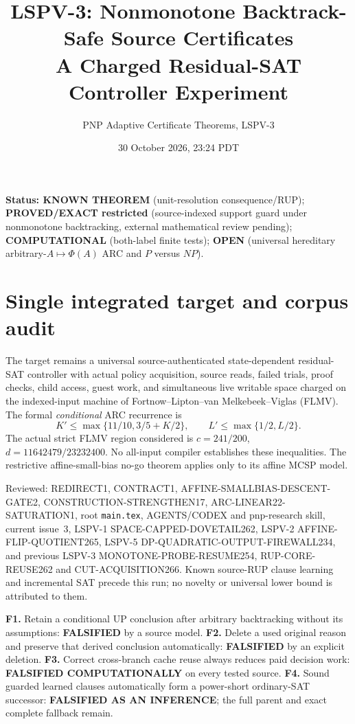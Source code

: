 \documentclass[11pt]{article}
\title{LSPV-3: Nonmonotone Backtrack-Safe Source Certificates\\A Charged Residual-SAT Controller Experiment}
\author{PNP Adaptive Certificate Theorems, LSPV-3}
\date{30 October 2026, 23:24 PDT}
\begin{document}
\maketitle
\noindent\textbf{Status: KNOWN THEOREM} (unit-resolution consequence/RUP);
\textbf{PROVED/EXACT restricted} (source-indexed support guard under
nonmonotone backtracking, external mathematical review pending);
\textbf{COMPUTATIONAL} (both-label finite tests); \textbf{OPEN}
(universal hereditary arbitrary-$A\mapsto\Phi(A)$ ARC and $P$ versus $NP$).

\section{Single integrated target and corpus audit}
The target remains a universal source-authenticated state-dependent residual-SAT
controller with actual policy acquisition, source reads, failed trials,
proof checks, child access, guest work, and simultaneous live writable space
charged on the indexed-input machine of Fortnow--Lipton--van Melkebeek--Viglas
(FLMV). The formal \emph{conditional} ARC recurrence is
\[
K'\le\max\{11/10,3/5+K/2\},\qquad
L'\le\max\{1/2,L/2\}.
\]
The actual strict FLMV region considered is
$c=241/200$, $d=11642479/23232400$.
No all-input compiler establishes these inequalities. The restrictive
affine-small-bias no-go theorem applies only to its affine MCSP model.

Reviewed: REDIRECT1, CONTRACT1, AFFINE-SMALLBIAS-DESCENT-GATE2,
CONSTRUCTION-STRENGTHEN17, ARC-LINEAR22-SATURATION1, root
\texttt{main.tex}, AGENTS/CODEX and pnp-research skill, current issue~3,
LSPV-1 SPACE-CAPPED-DOVETAIL262, LSPV-2 AFFINE-FLIP-QUOTIENT265,
LSPV-5 DP-QUADRATIC-OUTPUT-FIREWALL234, and previous LSPV-3
MONOTONE-PROBE-RESUME254, RUP-CORE-REUSE262 and CUT-ACQUISITION266.
Known source-RUP clause learning and incremental SAT precede this
run; no novelty or universal lower bound is attributed to them.

\noindent\textbf{F1.} Retain a conditional UP conclusion after arbitrary
backtracking without its assumptions: \textbf{FALSIFIED} by a source model.
\textbf{F2.} Delete a used original reason and preserve that derived
conclusion automatically: \textbf{FALSIFIED} by an explicit deletion.
\textbf{F3.} Correct cross-branch cache reuse always reduces paid decision
work: \textbf{FALSIFIED COMPUTATIONALLY} on every tested source.
\textbf{F4.} Sound guarded learned clauses automatically form a power-short
ordinary-SAT successor: \textbf{FALSIFIED AS AN INFERENCE}; the full
parent and exact complete fallback remain.
\end{document}
